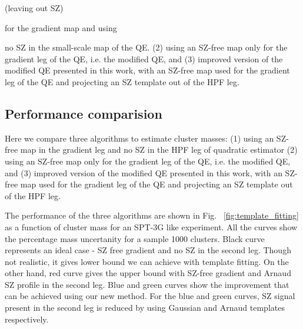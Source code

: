 (leaving out SZ)

for the gradient map and using 


no SZ in the small-scale map of the QE. 
(2) using an SZ-free map only for the gradient leg of the QE, i.e. the modified QE, 
 and (3) improved version of the modified QE presented in this work, with an SZ-free map used for the gradient leg of the QE and projecting an SZ template out of the  HPF leg.
 
 \subsection{Performance comparision} 
Here we compare three algorithms to estimate cluster masses:  
(1) using an SZ-free map in the gradient leg and no SZ in the HPF leg of quadratic estimator
(2) using an SZ-free map only for the gradient leg of the QE, i.e. the modified QE, 
 and (3) improved version of the modified QE presented in this work, with an SZ-free map used for the gradient leg of the QE and projecting an SZ template out of the  HPF leg. 


The performance of the three algorithms are shown in Fig. ~\ref{fig:template_fitting} as a function of cluster mass for an SPT-3G like experiment.
 All the curves show the percentage mass uncertanity for a sample 1000 clusters. 
Black curve represents an ideal case - SZ free gradient and no SZ in the second leg.
Though not realistic, it gives lower bound we can achieve with template fitting. 
On the other hand, red curve gives the upper bound with SZ-free gradient and Arnaud SZ profile in the second leg.
Blue and green curves show the improvement that can be achieved using our new method. 
For the blue and green curves, SZ signal present in the second leg is reduced by using Gaussian and Arnaud templates respectively.


